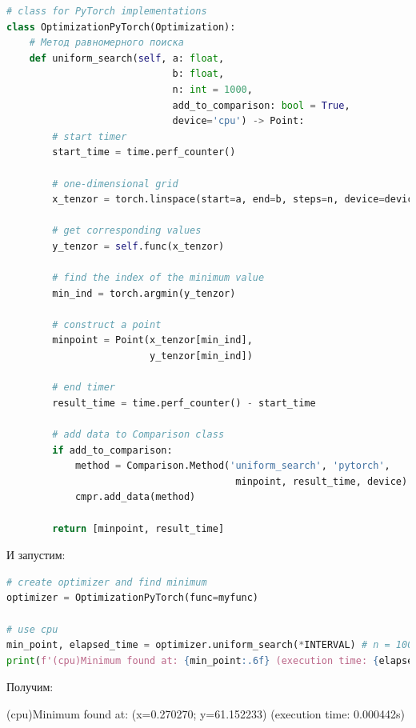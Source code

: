 \documentclass[a4paper, 14pt]{extarticle}
\begin{document}
\begin{center}
    \begin{lstlisting}[language=Python]
# class for PyTorch implementations
class OptimizationPyTorch(Optimization):
    # Метод равномерного поиска
    def uniform_search(self, a: float, 
                             b: float,
                             n: int = 1000,
                             add_to_comparison: bool = True,
                             device='cpu') -> Point:
        # start timer
        start_time = time.perf_counter()

        # one-dimensional grid
        x_tenzor = torch.linspace(start=a, end=b, steps=n, device=device)
        
        # get corresponding values
        y_tenzor = self.func(x_tenzor)

        # find the index of the minimum value
        min_ind = torch.argmin(y_tenzor)

        # construct a point
        minpoint = Point(x_tenzor[min_ind], 
                         y_tenzor[min_ind])

        # end timer
        result_time = time.perf_counter() - start_time

        # add data to Comparison class
        if add_to_comparison:
            method = Comparison.Method('uniform_search', 'pytorch', 
                                        minpoint, result_time, device)
            cmpr.add_data(method)

        return [minpoint, result_time]
    \end{lstlisting}
\end{center}

И запустим:

\begin{center}
    \begin{lstlisting}[language=Python]
# create optimizer and find minimum
optimizer = OptimizationPyTorch(func=myfunc)

# use cpu
min_point, elapsed_time = optimizer.uniform_search(*INTERVAL) # n = 1000 (default)
print(f'(cpu)Minimum found at: {min_point:.6f} (execution time: {elapsed_time:.6f}s)')
    \end{lstlisting}
\end{center}

Получим:

\begin{center}
    (cpu)Minimum found at: (x=0.270270; y=61.152233) (execution time: 0.000442s)
\end{center}
\end{document}
